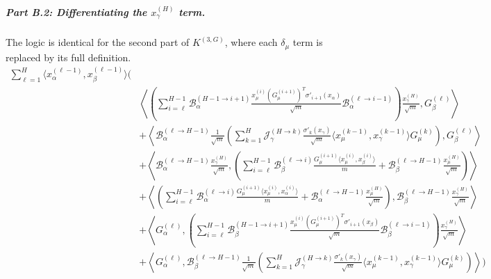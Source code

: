 \documentclass[11pt,a4paper]{article}
\theoremstyle{definition}
\begin{document}
    

\subparagraph{Part B.2: Differentiating the $x^{(H)}_\gamma$ term.}
The logic is identical for the second part of $K^{(3,G)}$, where each $\delta_\mu$ term is replaced by its full definition.
\begin{align}
\sum_{\ell=1}^{H} \langle x^{(\ell-1)}_\alpha, x^{(\ell-1)}_\beta \rangle \Biggl( & \nonumber \\
& \left\langle \left( \sum_{i=\ell}^{H-1} \mathcal{B}^{(H-1 \to i+1)}_\alpha \frac{x^{(i)}_\mu (G^{(i+1)}_\mu)^T \sigma'_{i+1}(x_\alpha)}{\sqrt{m}} \mathcal{B}^{(\ell \to i-1)}_\alpha \right) \frac{x^{(H)}_\gamma}{\sqrt{m}}, G^{(\ell)}_\beta \right\rangle \nonumber \\
& + \left\langle \mathcal{B}^{(\ell \to H-1)}_{\alpha} \frac{1}{\sqrt{m}}\left( \sum_{k=1}^{H} \mathcal{J}^{(H \to k)}_{\gamma} \frac{\sigma'_{k}(x_\gamma)}{\sqrt{m}} \langle x^{(k-1)}_\mu, x^{(k-1)}_\gamma \rangle G^{(k)}_\mu \right), G^{(\ell)}_\beta \right\rangle \nonumber \\
& + \left\langle \mathcal{B}^{(\ell \to H-1)}_{\alpha} \frac{x^{(H)}_\gamma}{\sqrt{m}}, \left( \sum_{i=\ell}^{H-1} \mathcal{B}^{(\ell \to i)}_{\beta} \frac{G^{(i+1)}_\mu \langle x^{(i)}_\mu, x^{(i)}_\beta \rangle}{m} + \mathcal{B}^{(\ell \to H-1)}_{\beta} \frac{x^{(H)}_\mu}{\sqrt{m}} \right) \right\rangle \nonumber \\
& + \left\langle \left( \sum_{i=\ell}^{H-1} \mathcal{B}^{(\ell \to i)}_{\alpha} \frac{G^{(i+1)}_\mu \langle x^{(i)}_\mu, x^{(i)}_\alpha \rangle}{m} + \mathcal{B}^{(\ell \to H-1)}_{\alpha} \frac{x^{(H)}_\mu}{\sqrt{m}} \right), \mathcal{B}^{(\ell \to H-1)}_{\beta} \frac{x^{(H)}_\gamma}{\sqrt{m}} \right\rangle \nonumber \\
& + \left\langle G^{(\ell)}_\alpha, \left( \sum_{i=\ell}^{H-1} \mathcal{B}^{(H-1 \to i+1)}_\beta \frac{x^{(i)}_\mu (G^{(i+1)}_\mu)^T \sigma'_{i+1}(x_\beta)}{\sqrt{m}} \mathcal{B}^{(\ell \to i-1)}_\beta \right) \frac{x^{(H)}_\gamma}{\sqrt{m}} \right\rangle \nonumber \\
& + \left\langle G^{(\ell)}_\alpha, \mathcal{B}^{(\ell \to H-1)}_{\beta} \frac{1}{\sqrt{m}}\left( \sum_{k=1}^{H} \mathcal{J}^{(H \to k)}_{\gamma} \frac{\sigma'_{k}(x_\gamma)}{\sqrt{m}} \langle x^{(k-1)}_\mu, x^{(k-1)}_\gamma \rangle G^{(k)}_\mu \right) \right\rangle \Biggr)
\end{align}
\end{document}
